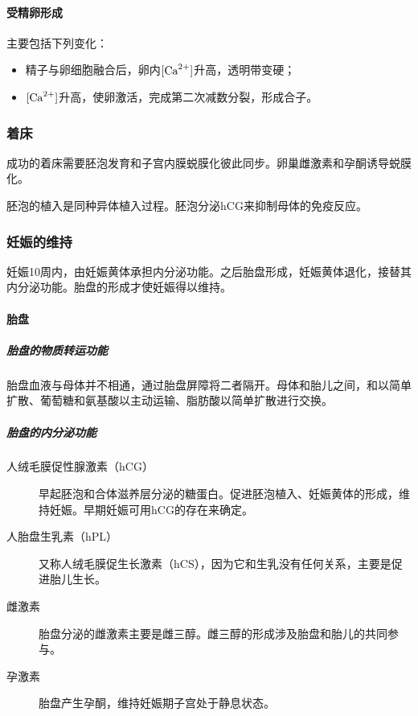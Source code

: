 \paragraph{受精卵形成}

主要包括下列变化：

\begin{itemize}
	\item 精子与卵细胞融合后，卵内$[\ce{Ca^{2+}}]$升高，透明带变硬；
	\item $[\ce{Ca^{2+}}]$升高，使卵激活，完成第二次减数分裂，形成合子。
\end{itemize}

\subsubsection{着床}

成功的着床需要胚泡发育和子宫内膜蜕膜化彼此同步。卵巢雌激素和孕酮诱导蜕膜化。

胚泡的植入是同种异体植入过程。胚泡分泌hCG来抑制母体的免疫反应。

\subsubsection{妊娠的维持}

妊娠10周内，由妊娠黄体承担内分泌功能。之后胎盘形成，妊娠黄体退化，接替其内分泌功能。胎盘的形成才使妊娠得以维持。

\paragraph{胎盘}

\subparagraph{胎盘的物质转运功能}

胎盘血液与母体并不相通，通过胎盘屏障将二者隔开。母体和胎儿之间，和以简单扩散、葡萄糖和氨基酸以主动运输、脂肪酸以简单扩散进行交换。

\subparagraph{胎盘的内分泌功能}

\begin{description}
	\item[人绒毛膜促性腺激素（hCG）] 早起胚泡和合体滋养层分泌的糖蛋白。促进胚泡植入、妊娠黄体的形成，维持妊娠。早期妊娠可用hCG的存在来确定。
	\item[人胎盘生乳素（hPL）] 又称人绒毛膜促生长激素（hCS），因为它和生乳没有任何关系，主要是促进胎儿生长。
	\item[雌激素] 胎盘分泌的雌激素主要是雌三醇。雌三醇的形成涉及胎盘和胎儿的共同参与。
	\item[孕激素] 胎盘产生孕酮，维持妊娠期子宫处于静息状态。
\end{description}

